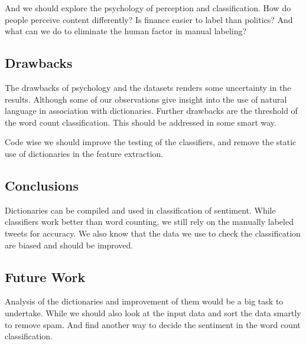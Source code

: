 And we should explore the psychology of perception and classification. How do
people perceive content differently? Is finance easier to label than politics?
And what can we do to eliminate the human factor in manual labeling? 

\subsection{Drawbacks}
The drawbacks of psychology and the datasets renders some uncertainty in the
results. Although some of our observations give insight into the use of natural
language in association with dictionaries. 
Further drawbacks are the threshold of the word count classification. This
should be addressed in some smart way. 

Code wise we should improve the testing of the classifiers, and remove the
static use of dictionaries in the feature extraction.  

\subsection{Conclusions}
Dictionaries can be compiled and used in classification of sentiment. While
classifiers work better than word counting, we still rely on the manually
labeled tweets for accuracy. We also know that the data we use
to check the classification are biased and should be improved. 

\subsection{Future Work}
Analysis of the dictionaries and improvement of them would be a big task to
undertake. While we should also look at the input data and sort the data
smartly to remove spam. And find another way to decide the sentiment in the
word count classification. 

